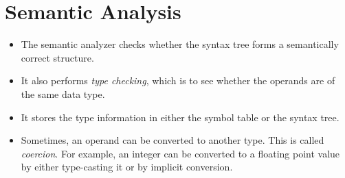\documentclass[hidelinks]{article}
\begin{document}
\section{Semantic Analysis}
    \begin{itemize}
        \item The semantic analyzer checks whether the syntax tree forms a semantically correct structure. 
        \item It also performs \textit{type checking}, which is to see whether the operands are of the same data type.
        \item It stores the type information in either the symbol table or the syntax tree.
        \item Sometimes, an operand can be converted to another type. This is called \textit{coercion}. For example, an integer can be converted to a floating point value by either type-casting it or by implicit conversion.
    \end{itemize}
\end{document}
